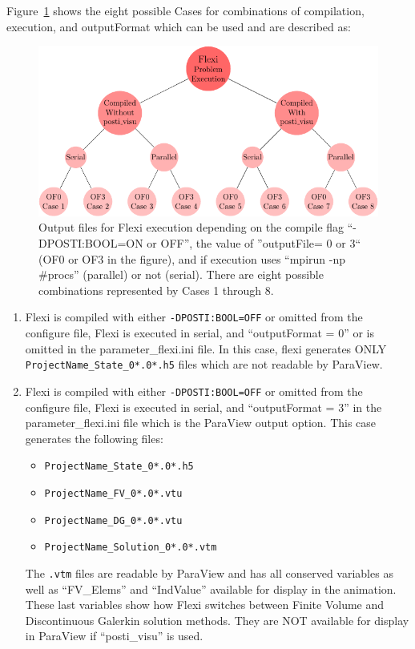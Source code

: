 \begin{appendices}
Figure~\ref{fig:chart} shows the eight possible Cases for combinations of compilation, execution, and outputFormat which can be used and are described as:

\begin{figure}[h!]
\centering
\includegraphics[width=\linewidth]{figures/chart-crop.pdf}
\caption{Output files for Flexi execution depending on the compile flag ``-DPOSTI:BOOL=ON or OFF'', the value of ''outputFile= 0  or 3`` (OF0 or OF3 in the figure), and if execution uses ``mpirun -np \#procs'' (parallel) or not (serial).  There are eight possible combinations represented by Cases 1 through 8.}
\label{fig:chart}
\end{figure}

\begingroup
\renewcommand{\labelenumi}{Case \theenumi:}
\begin{enumerate}
 \item Flexi is compiled with either \verb|-DPOSTI:BOOL=OFF| or omitted from the configure file, Flexi is executed in serial, and ``outputFormat = 0'' or is omitted in the parameter\_flexi.ini file.  In this case, flexi generates ONLY \verb|ProjectName_State_0*.0*.h5| files which are not readable by ParaView.

 \item Flexi is compiled with either \verb|-DPOSTI:BOOL=OFF| or omitted from the configure file, Flexi is executed in serial, and ``outputFormat = 3'' in the parameter\_flexi.ini file which is the ParaView output option. This case generates the following files:
 \begin{itemize}
  \item \verb|ProjectName_State_0*.0*.h5|
  \item \verb|ProjectName_FV_0*.0*.vtu|
  \item \verb|ProjectName_DG_0*.0*.vtu|
  \item \verb|ProjectName_Solution_0*.0*.vtm|
 \end{itemize}
 \noindent The \verb|.vtm| files are readable by ParaView and has all conserved variables as well as ``FV\_Elems'' and ``IndValue'' available for display in the animation.  These last variables show how Flexi switches between Finite Volume and Discontinuous Galerkin solution methods. They are NOT available for display in ParaView if ``posti\_visu'' is used.


\end{enumerate}
\end{appendices}
